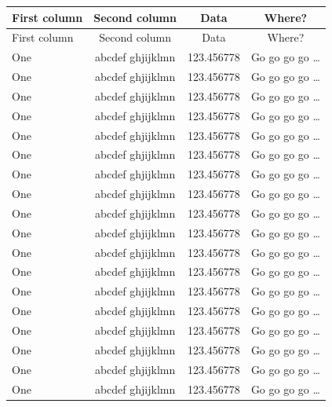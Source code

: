 \documentclass[phd,showframe]{ndsu-thesis-2022}
\begin{document}
{
\setlength{\LTleft}{1mm plus -1fill}%
\setlength{\LTright}{\LTleft}%
\singlespacing
\begin{longtable}{l c c c }%
        \toprule
	First column & Second column & Data & Where?\\
        \midrule
        \endfirsthead 

        \midrule
	First column & Second column & Data & Where?\\
        \midrule
        \endhead
One & abcdef ghjijklmn & 123.456778  & Go go go go \ldots \\
One & abcdef ghjijklmn & 123.456778  & Go go go go \ldots \\
One & abcdef ghjijklmn & 123.456778  & Go go go go \ldots \\
One & abcdef ghjijklmn & 123.456778  & Go go go go \ldots \\
One & abcdef ghjijklmn & 123.456778  & Go go go go \ldots \\
One & abcdef ghjijklmn & 123.456778  & Go go go go \ldots \\
One & abcdef ghjijklmn & 123.456778  & Go go go go \ldots \\
One & abcdef ghjijklmn & 123.456778  & Go go go go \ldots \\
One & abcdef ghjijklmn & 123.456778  & Go go go go \ldots \\
One & abcdef ghjijklmn & 123.456778  & Go go go go \ldots \\
One & abcdef ghjijklmn & 123.456778  & Go go go go \ldots \\
One & abcdef ghjijklmn & 123.456778  & Go go go go \ldots \\
One & abcdef ghjijklmn & 123.456778  & Go go go go \ldots \\
One & abcdef ghjijklmn & 123.456778  & Go go go go \ldots \\
One & abcdef ghjijklmn & 123.456778  & Go go go go \ldots \\
One & abcdef ghjijklmn & 123.456778  & Go go go go \ldots \\
One & abcdef ghjijklmn & 123.456778  & Go go go go \ldots \\
One & abcdef ghjijklmn & 123.456778  & Go go go go \ldots \\

\end{longtable}}
\end{document}
